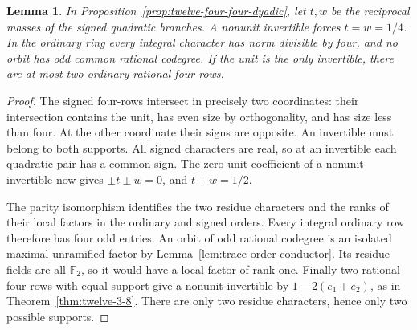 \documentclass[11pt,reqno]{amsart}
\newtheorem{lemma}[theorem]{Lemma}
\theoremstyle{remark}\newtheorem{remark}[theorem]{Remark}
\numberwithin{equation}{section}
\begin{document}
\begin{lemma}\label{lem:two-four-supports}
In Proposition~\ref{prop:twelve-four-four-dyadic}, let $t,w$ be
the reciprocal masses of the signed quadratic branches. A nonunit
invertible forces $t=w=1/4$. In the ordinary ring every integral
character has norm divisible by four, and no orbit has odd common
rational codegree. If the unit is the only invertible, there are
at most two ordinary rational four-rows.
\end{lemma}
\begin{proof}
The signed four-rows intersect in precisely two coordinates: their
intersection contains the unit, has even size by orthogonality, and
has size less than four. At the other coordinate their signs are
opposite. An invertible must belong to both supports. All signed
characters are real, so at an invertible each quadratic pair has
a common sign. The zero unit coefficient of a nonunit invertible
now gives $\pm t\pm w=0$, and $t+w=1/2$.

The parity isomorphism identifies the two residue characters and
the ranks of their local factors in the ordinary and signed orders.
Every integral ordinary row therefore has four odd entries. An orbit of odd rational codegree is an isolated maximal
unramified factor by Lemma~\ref{lem:trace-order-conductor}. Its residue fields are all $\mathbb F_2$, so it would
have a local factor of rank one. Finally two rational four-rows
with equal support give a nonunit invertible by
$1-2(e_1+e_2)$, as in Theorem~\ref{thm:twelve-3-8}. There are only
two residue characters, hence only two possible supports.
\end{proof}
\end{document}
